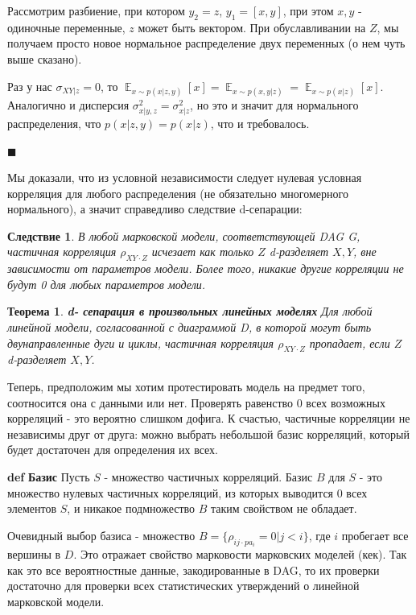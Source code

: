 \documentclass[fleqn]{article}
\DeclareMathOperator{\E}{\mathop\mathbb{E}}
\def\define#1{\textbf{def} \textbf{#1}}
\newtheorem{theorem}{Теорема}
\newtheorem{corollary}{Следствие}
\numberwithin{equation}{section}
\numberwithin{theorem}{section}
\numberwithin{figure}{section}
\numberwithin{lemma}{section}
\numberwithin{corollary}{section}
\begin{document}
Рассмотрим разбиение, при котором $y_2 = z$, $y_1 = [x,y]$, при этом $x,y$ - одиночные переменные, $z$ может быть вектором. При обуславливании на $Z$, мы получаем просто новое нормальное распределение двух переменных (о нем чуть выше сказано).

Раз у нас $\sigma_{XY|z} = 0$, то $\E_{x \sim p(x|z,y)} [x] = \E_{x \sim p(x,y|z)} = \E_{x \sim p(x|z)} [x]$. Аналогично и дисперсия $\sigma^2_{x|y,z} = \sigma^2_{x|z}$, но это и значит для нормального распределения, что $p(x|z,y) = p(x|z)$, что и требовалось.

$\blacksquare$

Мы доказали, что из условной независимости следует нулевая условная корреляция для любого распределения (не обязательно многомерного нормального), а значит справедливо следствие d-сепарации:

\begin{corollary}
	В любой марковской модели, соответствующей DAG G, частичная корреляция $\rho_{XY\cdot Z}$ исчезает как только $Z$ d-разделяет $X,Y$, вне зависимости от параметров модели. Более того, никакие другие корреляции не будут 0 для любых параметров модели.
\end{corollary}

\begin{theorem}
	\textbf{d- сепарация в произвольных линейных моделях} Для любой линейной модели, согласованной с диаграммой D, в которой могут быть двунаправленные дуги и циклы, частичная корреляция $\rho_{XY\cdot Z}$ пропадает, если $Z$ d-разделяет $X,Y$. 
\end{theorem}

Теперь, предположим мы хотим протестировать модель на предмет того, соотносится она с данными или нет. Проверять равенство 0 всех возможных корреляций - это вероятно слишком дофига. К счастью, частичные корреляции не независимы друг от друга: можно выбрать небольшой базис корреляций, который будет достаточен для определения их всех.

\define{Базис}  Пусть $S$ - множество частичных корреляций.  Базис $B$ для $S$ - это множество нулевых частичных корреляций, из которых выводится 0 всех элементов  $S$, и никакое подмножество $B$ таким свойством не обладает. 

Очевидный выбор базиса - множество $B = \{\rho_{ij\cdot pa_i} = 0| j < i\}$, где $i$ пробегает все вершины в $D$. Это отражает свойство марковости марковских моделей (кек). Так как это все вероятностные данные, закодированные в DAG, то их проверки достаточно для проверки всех статистических утверждений о линейной марковской модели. 
\end{document}

